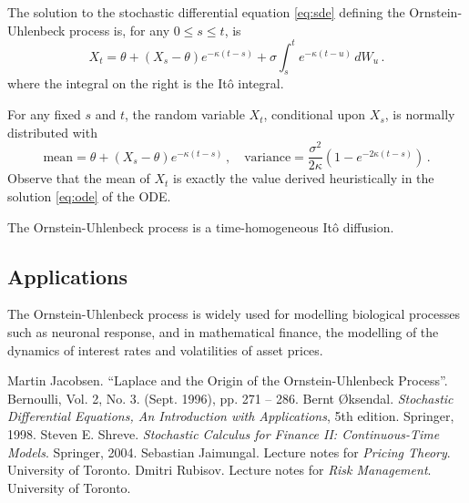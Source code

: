 \documentclass[12pt]{article}
\begin{document}
The solution to the stochastic differential equation \eqref{eq:sde}
defining the Ornstein-Uhlenbeck process is, for any $0 \leq s \leq t$, is
\[
X_t = \theta + (X_s - \theta) e^{-\kappa (t-s)}
+ \sigma \int_s^t e^{-\kappa(t-u)} \, dW_u\,.
\]
where the integral on the right is the It\^o integral.

For any fixed $s$ and $t$, the random variable $X_t$, conditional
upon $X_s$, is normally distributed with 
\[
\text{mean} = \theta + (X_s - \theta) e^{-\kappa(t-s)}
\,,
\quad
\text{variance} = \frac{\sigma^2}{2\kappa} (1 - e^{-2\kappa (t-s)})\,.
\]
Observe that the mean of $X_t$ is exactly
the value derived heuristically
in the solution \eqref{eq:ode} of the ODE.

The Ornstein-Uhlenbeck process is a time-homogeneous It\^o diffusion.

\subsection*{Applications}

The Ornstein-Uhlenbeck process is widely used for modelling
biological processes such as neuronal response,
and in mathematical finance,
the modelling of the dynamics of interest rates
and volatilities of asset prices.

\begin{thebibliography}{6}
Martin Jacobsen. ``Laplace and the Origin of the Ornstein-Uhlenbeck Process''.
Bernoulli, Vol. 2, No. 3. (Sept. 1996), pp. 271 -- 286.
Bernt \O{}ksendal.
\emph{Stochastic Differential Equations,
An Introduction with Applications}, 5th edition. Springer, 1998.
Steven E. Shreve. \emph{Stochastic Calculus for Finance II: 
Continuous-Time Models}. Springer, 2004.
Sebastian Jaimungal. Lecture notes for \emph{Pricing Theory}.
University of Toronto.
Dmitri Rubisov. Lecture notes for \emph{Risk Management}.
University of Toronto.
\end{thebibliography}

\end{document}
